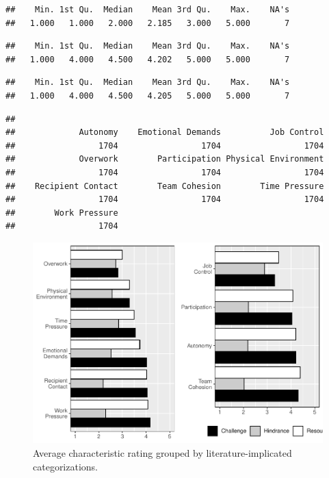 \documentclass[
  english,
  man]{apa6}
\begin{document}
\begin{verbatim}
##    Min. 1st Qu.  Median    Mean 3rd Qu.    Max.    NA's 
##   1.000   1.000   2.000   2.185   3.000   5.000       7
\end{verbatim}

\begin{verbatim}
##    Min. 1st Qu.  Median    Mean 3rd Qu.    Max.    NA's 
##   1.000   4.000   4.500   4.202   5.000   5.000       7
\end{verbatim}

\begin{verbatim}
##    Min. 1st Qu.  Median    Mean 3rd Qu.    Max.    NA's 
##   1.000   4.000   4.500   4.205   5.000   5.000       7
\end{verbatim}

\begin{verbatim}
## 
##             Autonomy    Emotional Demands          Job Control 
##                 1704                 1704                 1704 
##             Overwork        Participation Physical Environment 
##                 1704                 1704                 1704 
##    Recipient Contact        Team Cohesion        Time Pressure 
##                 1704                 1704                 1704 
##        Work Pressure 
##                 1704
\end{verbatim}

\begin{figure}
\centering
\includegraphics{Submission_files/figure-latex/scalelevelgraphs-1.pdf}
\caption{\label{fig:scalelevelgraphs}Average characteristic rating grouped by literature-implicated categorizations.}
\end{figure}
\end{document}
